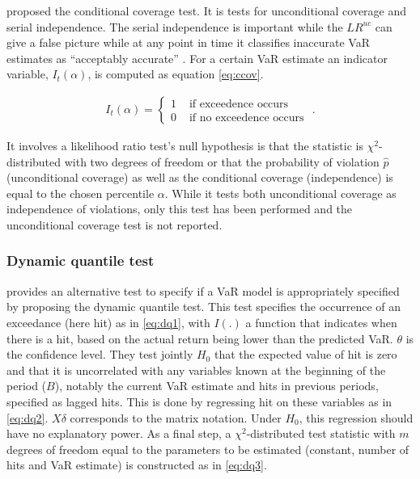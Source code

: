 \documentclass[a4paper, nobind]{templates/ociamthesis}
\begin{document}
\noindent \textcite{christoffersen2001} proposed the conditional coverage test. It is tests for unconditional coverage and serial independence. The serial independence is important while the \(L R^{u c}\) can give a false picture while at any point in time it classifies inaccurate VaR estimates as ``acceptably accurate'' \autocite{bali2007}. For a certain VaR estimate an indicator variable, \(I_t(\alpha)\), is computed as equation \eqref{eq:ccov}.

\begin{align}
I_{t}(\alpha)=\left\{\begin{array}{ll}
1 & \text { if exceedence occurs } \\
0 & \text { if no exceedence occurs }
\end{array} .\right.
\label{eq:ccov}
\end{align}

\noindent It involves a likelihood ratio test's null hypothesis is that the statistic is \(\chi^2\)-distributed with two degrees of freedom or that the probability of violation \(\hat p\) (unconditional coverage) as well as the conditional coverage (independence) is equal to the chosen percentile \(\alpha\). While it tests both unconditional coverage as independence of violations, only this test has been performed and the unconditional coverage test is not reported.

\hypertarget{dynamic-quantile-test}{%
\subsubsection{Dynamic quantile test}\label{dynamic-quantile-test}}

\noindent \textcite{engle2004} provides an alternative test to specify if a VaR model is appropriately specified by proposing the dynamic quantile test. This test specifies the occurrence of an exceedance (here hit) as in \eqref{eq:dq1}, with \(I(.)\) a function that indicates when there is a hit, based on the actual return being lower than the predicted VaR. \(\theta\) is the confidence level. They test jointly \(H_0\) that the expected value of hit is zero and that it is uncorrelated with any variables known at the beginning of the period (\(B\)), notably the current VaR estimate and hits in previous periods, specified as lagged hits. This is done by regressing hit on these variables as in \eqref{eq:dq2}. \(X\delta\) corresponds to the matrix notation. Under \(H_0\), this regression should have no explanatory power. As a final step, a \(\chi^2\)-distributed test statistic with \(m\) degrees of freedom equal to the parameters to be estimated (constant, number of hits and VaR estimate) is constructed as in \eqref{eq:dq3}.
\end{document}
